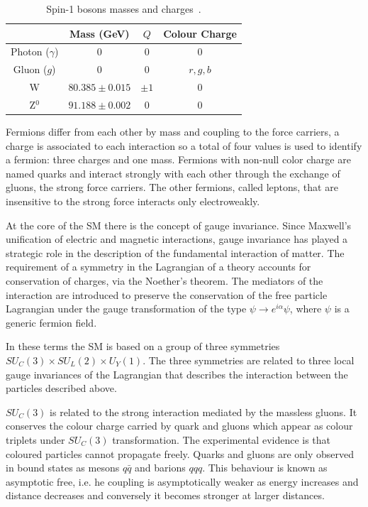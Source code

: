 \begin{table}[ht]
  \begin{center}
    \begin{tabular}{|c|c|c|c|}
    \hline
    & Mass (GeV)
    & $Q$
    & Colour Charge \\
    \hline
      \hline
      Photon ($\gamma$) & 0 & 0 & 0 \\
      Gluon ($g$) & 0 & 0 & $r,g,b$ \\
      W & $80.385 \pm 0.015$ & $\pm 1$ & 0 \\
      Z$^0$ & $91.188 \pm 0.002$ & 0 & 0 \\
    \hline
    \end{tabular}
  \end{center}
  \caption{Spin-1 bosons masses and charges~\cite{PDG}.}
  \label{tab:bosons}
\end{table}

Fermions differ from each other by mass and coupling to the force carriers, a charge is associated
to each interaction so a total of four values is used to identify a fermion: three charges and one mass.
Fermions with non-null color charge are named quarks and interact strongly with each other through the exchange
of gluons, the strong force carriers. The other fermions, called leptons, that are insensitive to
the strong force interacts only electroweakly.

At the core of the SM there is the concept of gauge invariance.
Since Maxwell's unification of electric and magnetic interactions, gauge invariance
has played a strategic role in the description of the fundamental interaction of matter.
The requirement of a symmetry in the Lagrangian of a theory accounts for conservation of
charges, via the Noether's theorem.
The mediators of the interaction are introduced to preserve the conservation of
the free particle Lagrangian under the gauge transformation of the type $\psi \to e^{i\alpha}\psi$, where
$\psi$ is a generic fermion field.

In these terms the SM is based on a group of three symmetries $SU_C(3)\times SU_L(2) \times U_Y(1)$.
The three symmetries are related to three local gauge invariances of the Lagrangian that describes the interaction
between the particles described above.

$SU_C(3)$ is related to the strong interaction mediated by the massless gluons. It conserves the colour charge
carried by quark and gluons which appear as colour triplets under $SU_C(3)$ transformation.
The experimental evidence is that coloured particles cannot propagate freely.
Quarks and gluons are only observed in bound states as mesons $q\bar{q}$ and barions $qqq$.
This behaviour is known as
asymptotic free, i.e. he coupling is asymptotically weaker as energy increases and distance decreases
and conversely it becomes stronger at larger distances.

